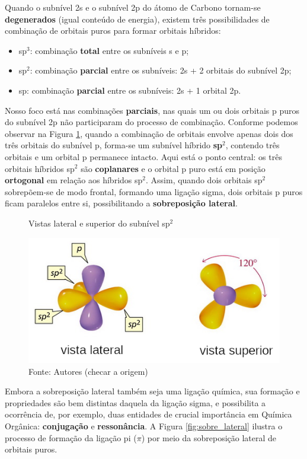 Quando o subnível 2s e o subnível 2p do átomo de Carbono tornam-se \textbf{degenerados} (igual conteúdo de energia), existem três possibilidades de combinação de orbitais puros para formar orbitais híbridos:

\begin{itemize}
	\item sp$^3$: combinação \textbf{total} entre os subníveis s e p;
	\item sp$^2$: combinação \textbf{parcial} entre os subníveis: 2s + 2 orbitais do subnível 2p;
	\item sp: combinação \textbf{parcial} entre os subníveis: 2s + 1 orbital 2p.
\end{itemize}

Nosso foco está nas combinações \textbf{parciais}, nas quais um ou dois orbitais p puros do subnível 2p não participaram do processo de combinação. Conforme podemos observar na Figura \ref{fig:vistas_sp2}, quando a combinação de orbitais envolve apenas dois dos três orbitais do subnível p, forma-se um subnível híbrido  \textbf{sp$^2$}, contendo três orbitais e um orbital p permanece intacto. Aqui está o ponto central: os três orbitais híbridos sp$^2$ são \textbf{coplanares} e o orbital p puro está em posição \textbf{ortogonal} em relação aos híbridos sp$^2$. Assim, quando dois orbitais sp$^2$ sobrepõem-se de modo frontal, formando uma ligação sigma, dois orbitais p puros ficam paralelos entre si, possibilitando a \textbf{sobreposição lateral}.

\begin{figure}[h]
\centering
\caption{Vistas lateral e superior do subnível sp$^2$}
\vspace{0.25cm}
\label{fig:vistas_sp2}
\includegraphics[width=0.65\linewidth]{imagens/hibrido_sp2.png}
\caption*{Fonte: Autores (checar a origem)}
\end{figure}

Embora a sobreposição lateral também seja uma ligação química, sua formação e propriedades são bem distintas daquela da ligação sigma, e possibilita a ocorrência de, por exemplo, duas entidades de crucial importância em Química Orgânica: \textbf{conjugação} e \textbf{ressonância}. A Figura \ref{fig:sobre_lateral} ilustra o processo de formação da ligação pi ($\pi$) por meio da sobreposição lateral de orbitais puros.


